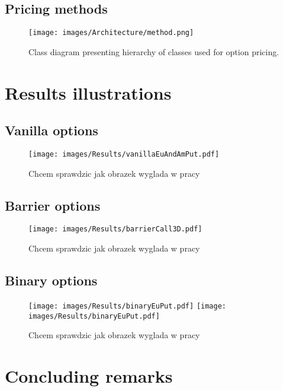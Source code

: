 \documentclass[a4paper,11pt, twoside]{book}
\theoremstyle{definition}
\theoremstyle{remark}
\begin{document}
\section{Pricing methods}
\begin{sidewaysfigure}
\centering
 \texttt{[image: images/Architecture/method.png]}
\caption{Class diagram presenting hierarchy of classes used for option pricing.}
\label{fig:arch:method}
\end{sidewaysfigure}

\chapter{Results illustrations}
 
\section{Vanilla options}

\begin{figure}[!ht]
\centering
 \texttt{[image: images/Results/vanillaEuAndAmPut.pdf]}
\caption{Chcem sprawdzic jak obrazek wyglada w pracy}
\label{fig:results:dupa1}
\end{figure}

\section{Barrier options}
\begin{figure}[!ht]
\centering
 \texttt{[image: images/Results/barrierCall3D.pdf]}
\caption{Chcem sprawdzic jak obrazek wyglada w pracy}
\label{fig:results:dupa2}
\end{figure}

\section{Binary options}
\begin{figure}[!ht]
\centering
 \texttt{[image: images/Results/binaryEuPut.pdf]}
 \texttt{[image: images/Results/binaryEuPut.pdf]}
\caption{Chcem sprawdzic jak obrazek wyglada w pracy}
\label{fig:results:dupa3}
\end{figure}

\chapter*{Concluding remarks}
 
\end{document}
